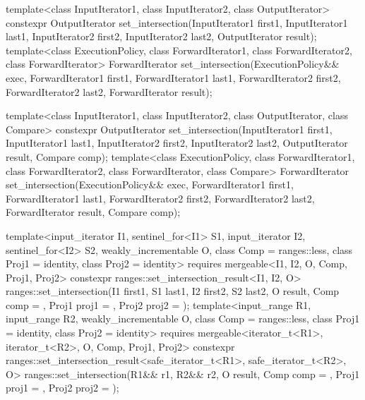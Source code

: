 %
\begin{itemdecl}
template<class InputIterator1, class InputIterator2,
         class OutputIterator>
  constexpr OutputIterator
    set_intersection(InputIterator1 first1, InputIterator1 last1,
                     InputIterator2 first2, InputIterator2 last2,
                     OutputIterator result);
template<class ExecutionPolicy, class ForwardIterator1, class ForwardIterator2,
         class ForwardIterator>
  ForwardIterator
    set_intersection(ExecutionPolicy&& exec,
                     ForwardIterator1 first1, ForwardIterator1 last1,
                     ForwardIterator2 first2, ForwardIterator2 last2,
                     ForwardIterator result);

template<class InputIterator1, class InputIterator2,
         class OutputIterator, class Compare>
  constexpr OutputIterator
    set_intersection(InputIterator1 first1, InputIterator1 last1,
                     InputIterator2 first2, InputIterator2 last2,
                     OutputIterator result, Compare comp);
template<class ExecutionPolicy, class ForwardIterator1, class ForwardIterator2,
         class ForwardIterator, class Compare>
  ForwardIterator
    set_intersection(ExecutionPolicy&& exec,
                     ForwardIterator1 first1, ForwardIterator1 last1,
                     ForwardIterator2 first2, ForwardIterator2 last2,
                     ForwardIterator result, Compare comp);

template<input_iterator I1, sentinel_for<I1> S1, input_iterator I2, sentinel_for<I2> S2,
         weakly_incrementable O, class Comp = ranges::less,
         class Proj1 = identity, class Proj2 = identity>
  requires mergeable<I1, I2, O, Comp, Proj1, Proj2>
  constexpr ranges::set_intersection_result<I1, I2, O>
    ranges::set_intersection(I1 first1, S1 last1, I2 first2, S2 last2, O result,
                             Comp comp = {}, Proj1 proj1 = {}, Proj2 proj2 = {});
template<input_range R1, input_range R2, weakly_incrementable O,
         class Comp = ranges::less, class Proj1 = identity, class Proj2 = identity>
  requires mergeable<iterator_t<R1>, iterator_t<R2>, O, Comp, Proj1, Proj2>
  constexpr ranges::set_intersection_result<safe_iterator_t<R1>, safe_iterator_t<R2>, O>
    ranges::set_intersection(R1&& r1, R2&& r2, O result,
                             Comp comp = {}, Proj1 proj1 = {}, Proj2 proj2 = {});
\end{itemdecl}

